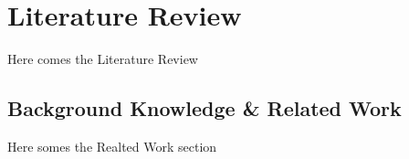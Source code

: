 \chapter{Literature Review}
\label{sec:lit_review}
Here comes the Literature Review
\section{Background Knowledge \& Related Work}
\label{sec:tinyml}
Here somes the Realted Work section

